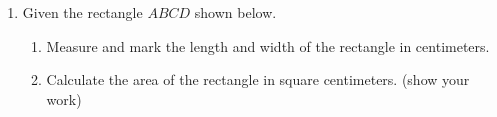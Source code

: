 \begin{enumerate}
\item Given the rectangle $ABCD$ shown below.
  \begin{enumerate}
    \item Measure and mark the length and width of the rectangle in centimeters.
    \item Calculate the area of the rectangle in square centimeters. (show your work)
  \end{enumerate}
  \vspace{2cm}
  \begin{center}
  \end{center}


\end{enumerate}
